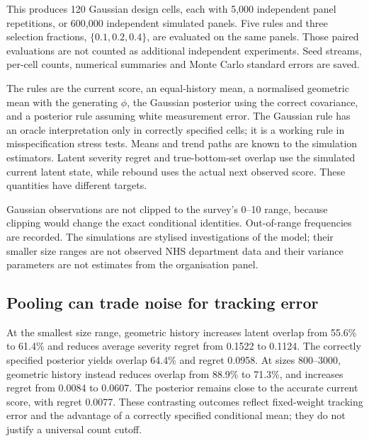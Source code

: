 \documentclass[11pt,letterpaper]{article}
\begin{document}
This produces 120 Gaussian design cells, each with 5,000 independent panel repetitions, or 600,000 independent simulated panels. Five rules and three selection fractions, $\{0.1,0.2,0.4\}$, are evaluated on the same panels. Those paired evaluations are not counted as additional independent experiments. Seed streams, per-cell counts, numerical summaries and Monte Carlo standard errors are saved.

The rules are the current score, an equal-history mean, a normalised geometric mean with the generating $\phi$, the Gaussian posterior using the correct covariance, and a posterior rule assuming white measurement error. The Gaussian rule has an oracle interpretation only in correctly specified cells; it is a working rule in misspecification stress tests. Means and trend paths are known to the simulation estimators. Latent severity regret and true-bottom-set overlap use the simulated current latent state, while rebound uses the actual next observed score. These quantities have different targets.

Gaussian observations are not clipped to the survey's 0--10 range, because clipping would change the exact conditional identities. Out-of-range frequencies are recorded. The simulations are stylised investigations of the model; their smaller size ranges are not observed NHS department data and their variance parameters are not estimates from the organisation panel.

\subsection{Pooling can trade noise for tracking error}
\begin{table}[t]
\centering\small\setlength{\tabcolsep}{3.5pt}

\caption{Reference Gaussian simulation slice: $\phi=0.85$, $\sigma^2=6.25$, white measurement error and $k=16$ of 80 units. Hit is overlap with the realised latent bottom set; regret is the mean excess latent score per selected unit. These are assumed-parameter simulation results.}
\label{tab:simulation}
\end{table}

At the smallest size range, geometric history increases latent overlap from 55.6\% to 61.4\% and reduces average severity regret from 0.1522 to 0.1124. The correctly specified posterior yields overlap 64.4\% and regret 0.0958. At sizes 800--3000, geometric history instead reduces overlap from 88.9\% to 71.3\%, and increases regret from 0.0084 to 0.0607. The posterior remains close to the accurate current score, with regret 0.0077. These contrasting outcomes reflect fixed-weight tracking error and the advantage of a correctly specified conditional mean; they do not justify a universal count cutoff.
\end{document}
